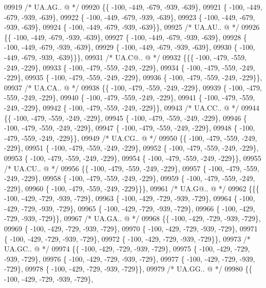 \begin{DoxyCode}
09919 \textcolor{comment}{/* UA.AG.. @ */}
09920 \{\{ -100, -449, -679, -939, -639\},
09921 \{ -100, -449, -679, -939, -639\},
09922 \{ -100, -449, -679, -939, -639\},
09923 \{ -100, -449, -679, -939, -639\},
09924 \{ -100, -449, -679, -939, -639\}\},
09925 \textcolor{comment}{/* UA.AU.. @ */}
09926 \{\{ -100, -449, -679, -939, -639\},
09927 \{ -100, -449, -679, -939, -639\},
09928 \{ -100, -449, -679, -939, -639\},
09929 \{ -100, -449, -679, -939, -639\},
09930 \{ -100, -449, -679, -939, -639\}\}\},
09931 \textcolor{comment}{/* UA.C@.. @ */}
09932 \{\{\{ -100, -479, -559, -249, -229\},
09933 \{ -100, -479, -559, -249, -229\},
09934 \{ -100, -479, -559, -249, -229\},
09935 \{ -100, -479, -559, -249, -229\},
09936 \{ -100, -479, -559, -249, -229\}\},
09937 \textcolor{comment}{/* UA.CA.. @ */}
09938 \{\{ -100, -479, -559, -249, -229\},
09939 \{ -100, -479, -559, -249, -229\},
09940 \{ -100, -479, -559, -249, -229\},
09941 \{ -100, -479, -559, -249, -229\},
09942 \{ -100, -479, -559, -249, -229\}\},
09943 \textcolor{comment}{/* UA.CC.. @ */}
09944 \{\{ -100, -479, -559, -249, -229\},
09945 \{ -100, -479, -559, -249, -229\},
09946 \{ -100, -479, -559, -249, -229\},
09947 \{ -100, -479, -559, -249, -229\},
09948 \{ -100, -479, -559, -249, -229\}\},
09949 \textcolor{comment}{/* UA.CG.. @ */}
09950 \{\{ -100, -479, -559, -249, -229\},
09951 \{ -100, -479, -559, -249, -229\},
09952 \{ -100, -479, -559, -249, -229\},
09953 \{ -100, -479, -559, -249, -229\},
09954 \{ -100, -479, -559, -249, -229\}\},
09955 \textcolor{comment}{/* UA.CU.. @ */}
09956 \{\{ -100, -479, -559, -249, -229\},
09957 \{ -100, -479, -559, -249, -229\},
09958 \{ -100, -479, -559, -249, -229\},
09959 \{ -100, -479, -559, -249, -229\},
09960 \{ -100, -479, -559, -249, -229\}\}\},
09961 \textcolor{comment}{/* UA.G@.. @ */}
09962 \{\{\{ -100, -429, -729, -939, -729\},
09963 \{ -100, -429, -729, -939, -729\},
09964 \{ -100, -429, -729, -939, -729\},
09965 \{ -100, -429, -729, -939, -729\},
09966 \{ -100, -429, -729, -939, -729\}\},
09967 \textcolor{comment}{/* UA.GA.. @ */}
09968 \{\{ -100, -429, -729, -939, -729\},
09969 \{ -100, -429, -729, -939, -729\},
09970 \{ -100, -429, -729, -939, -729\},
09971 \{ -100, -429, -729, -939, -729\},
09972 \{ -100, -429, -729, -939, -729\}\},
09973 \textcolor{comment}{/* UA.GC.. @ */}
09974 \{\{ -100, -429, -729, -939, -729\},
09975 \{ -100, -429, -729, -939, -729\},
09976 \{ -100, -429, -729, -939, -729\},
09977 \{ -100, -429, -729, -939, -729\},
09978 \{ -100, -429, -729, -939, -729\}\},
09979 \textcolor{comment}{/* UA.GG.. @ */}
09980 \{\{ -100, -429, -729, -939, -729\},

\end{DoxyCode}
